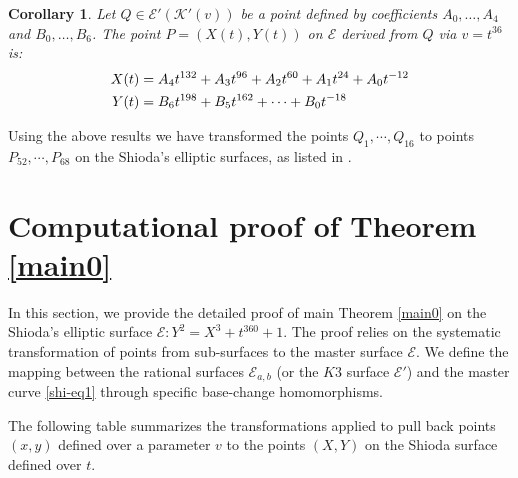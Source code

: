 \documentclass[11pt]{amsart}
\newcommand{\Ee}{{\mathcal E}}
\newcommand{\KK}{{\mathcal K}}
\newtheorem{cor}[thm]{Corollary}
\numberwithin{equation}{section}
\numberwithin{table}{section}
\newcommand\<{\langle}
\begin{document}
 \begin{cor}
 	\label{case_1_10}
 	Let $Q \in \Ee' (\KK'(v))$ be a point defined by coefficients $A_0, \dots, A_4$ and $B_0, \dots, B_6$.
 The point $P=(X(t), Y(t))$ on $\Ee$ derived from $Q$ via $v=t^{36}$ is:
 		\begin{align}
 			 X(t) & =   A_4 t^{132} + A_3 t^{96} + A_2 t^{60} + A_1 t^{24} + A_0 t^{-12} \notag \\ 			 
 			 Y(t) &=   B_6 t^{198} + B_5 t^{162} + \dots + B_0 t^{-18} 
 			 \end{align}
 \end{cor}
 
 Using the above results we have transformed the points $Q_1,\cdots, Q_16$ to points $P_{52}, \cdots, P_{68}$ on the Shioda's elliptic surfaces, as listed in \cite[Points68]{Shioda360-Codes}.
 
\section{Computational proof of Theorem \ref{main0}}
\label{proof}
In this section, we provide the detailed proof of main Theorem \ref{main0} on the Shioda's elliptic surface $\Ee: Y^2 = X^3 + t^{360} + 1$.
	The proof  relies on the systematic transformation of points from sub-surfaces to the master surface $\mathcal{E}$. We define the mapping between the rational surfaces $\mathcal{E}_{a,b}$ (or the $K3$ surface $\mathcal{E}'$) and the master curve \eqref{shi-eq1} through specific base-change homomorphisms.


The following table summarizes the transformations applied to pull back points $(x, y)$ defined over a parameter $v$ to the points $(X,Y)$ on the Shioda surface defined over $t$.
\end{document}
